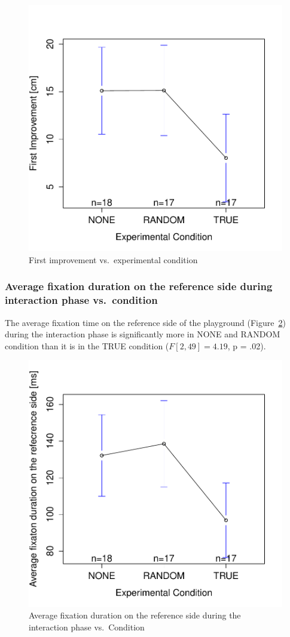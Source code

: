\documentclass{sig-alternate}
\begin{document}
\begin{figure}[h!]
    \centering
    \includegraphics[width=0.8\linewidth]{meanPlotFirstImprove}
    \caption{First improvement vs.~experimental condition}
    \label{res2}
\end{figure}

\subsubsection{Average fixation duration on the reference side during interaction
phase vs.~condition}

The average fixation time on the reference side of the playground
(Figure~\ref{res3}) during the interaction phase is significantly more in {\sf NONE}
and {\sf RANDOM} condition than it is in the {\sf TRUE} condition ($F[2,49]=4.19$,
p = .02).

\begin{figure}[h!]
    \centering
    \includegraphics[width=0.8\linewidth]{meanPlotFixReference}
    \caption{Average fixation duration on the reference side during the
    interaction phase vs.~Condition}
    \label{res3}
\end{figure}
\end{document}
